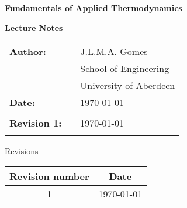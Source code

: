 \documentclass[11pts,a4paper,amsmath,amssymb,floatfix]{book}
\theoremstyle{definition}
\begin{document}
\let\cleardoublepage\clearpage

\vspace{4cm}

\begin{titlepage}
\begin{center}
\bigskip


\bigskip
\vspace{3.5cm}

   {\bf{\Huge Fundamentals of Applied Thermodynamics }}

\bigskip
   {\bf{\huge Lecture Notes}}

\vspace{3.5cm}

\end{center}

\begin{tabular}{l c l}
{\bf{\large Author:}}                          &     & J.L.M.A. Gomes \\
                                               &     & School of Engineering \\
                                               &     & University of Aberdeen \\
\bigskip
{\bf{\large Date:}}                            &     &   \today\\
                                               &     &         \\
{\bf{\large Revision 1:}}                      &     &   \today\\
                                               &     &         \\
\end{tabular}
\vspace{3.5cm}

\bigskip

\bigskip
\end{titlepage}


\begin{center}
  \Large{ Revisions}

\bigskip

\begin{tabular}{ c c}
\hline
{\bf Revision number}  & {\bf Date } \\
\hline
  1                    & \today \\
\hline 
\end{tabular}
\end{center}
\end{document}
